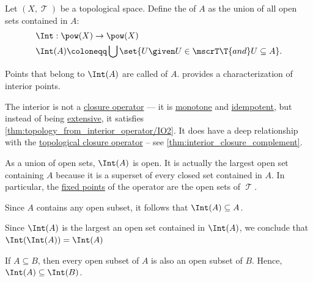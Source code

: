 \begin{definition}\label{def:topological_interior_operator}
  Let \( (X, \mscrT) \) be a topological space. Define the  of \( A \) as the union of all open sets contained in \( A \):
  \begin{equation*}
    \begin{aligned}
      &\Int: \pow(X) \to \pow(X) \\
      &\Int(A) \coloneqq \bigcup \set{ U \given U \in \mscrT \T{and} U \subseteq A }.
    \end{aligned}
  \end{equation*}

  Points that belong to \( \Int(A) \) are called  of \( A \).  provides a characterization of interior points.

  The interior is not a \hyperref[def:abstract_closure_operator]{closure operator} --- it is \hyperref[def:order_function/preserving]{monotone} and \hyperref[def:binary_operation/idempotent]{idempotent}, but instead of being \hyperref[def:extensive_function]{extensive}, it satisfies \ref{thm:topology_from_interior_operator/IO2}. It does have a deep relationship with the \hyperref[def:topological_closure_operator]{topological closure operator} -- see \cref{thm:interior_closure_complement}.
\end{definition}
\begin{comments}
  \item As a union of open sets, \( \Int(A) \) is open. It is actually the largest open set containing \( A \) because it is a superset of every closed set contained in \( A \). In particular, the \hyperref[def:function_fixed_point]{fixed points} of the operator are the open sets of \( \mscrT \).
\end{comments}
\begin{defproof}
   Since \( A \) contains any open subset, it follows that \( \Int(A) \subseteq A \).

   Since \( \Int(A) \) is the largest an open set contained in \( \Int(A) \), we conclude that \( \Int(\Int(A)) = \Int(A) \)

   If \( A \subseteq B \), then every open subset of \( A \) is also an open subset of \( B \). Hence, \( \Int(A) \subseteq \Int(B) \).
\end{defproof}


